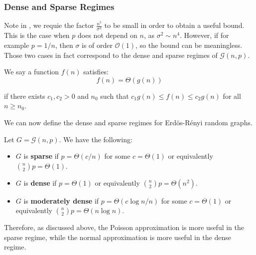 \documentclass{article}
\begin{document}
\subsubsection{Dense and Sparse Regimes}  

Note in , we requie the factor $\frac{n^5}{\sigma^3}$ to be small in order to obtain a useful bound. This is the case when $p$ does not depend on $n$, as $\sigma^2 \sim n^4$. However, if for example $p=1/n$, then $\sigma$ is of order $\mathcal{O}(1)$, so the bound can be meaningless.  Those two cases in fact correspond to the dense and sparse regimes of $\mathcal{G}(n,p)$.  

\begin{definition}
    We say a function $f(n)$ satisfies:
    \[
        f(n) = \Theta(g(n))
        \]

    if there exists $c_1, c_2 > 0$ and $n_0$ such that $c_1 g(n) \leq f(n) \leq c_2 g(n)$ for all $n\geq n_0$.
\end{definition}

We can now define the dense and sparse regimes for Erd\"os-R\'enyi random graphs.

\begin{definition}
    Let $G=\mathcal{G}(n,p)$. We have the following:
    \begin{itemize}
        \item $G$ is \textbf{sparse} if $p=\Theta(c/n)$ for some $c=\Theta(1)$ or equivalently $\binom{n}{2}p=\Theta(1)$.
        \item $G$ is \textbf{dense} if $p=\Theta(1)$ or equivalently $\binom{n}{2}p=\Theta(n^2)$.
        \item $G$ is \textbf{moderately dense} if $p=\Theta(c\log n/n)$ for some $c=\Theta(1)$ or equivalently $\binom{n}{2}p=\Theta(n\log n)$.
    \end{itemize}
\end{definition}

Therefore, as discussed above, the Poisson approximation is more useful in the sparse regime, while the normal approximation is more useful in the dense regime.  


\newpage


\end{document}
